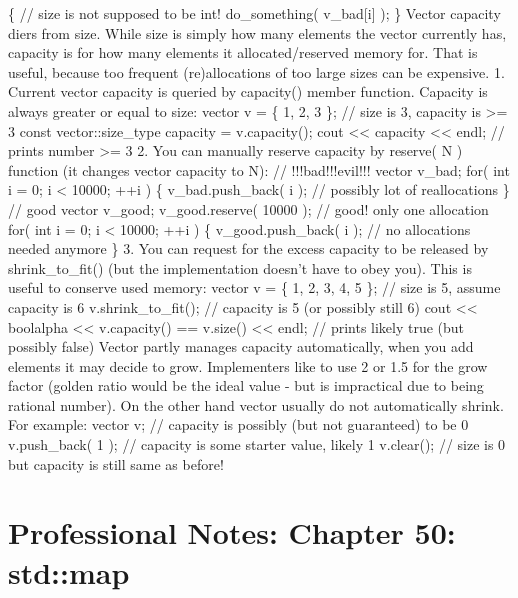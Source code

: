 \{ // size is not supposed to be int! do\_something( v\_bad{[}i{]} ); \}
Vector capacity diers from size. While size is simply how many elements
the vector currently has, capacity is for how many elements it
allocated/reserved memory for. That is useful, because too frequent
(re)allocations of too large sizes can be expensive. 1. Current vector
capacity is queried by capacity() member function. Capacity is always
greater or equal to size: vector v = \{ 1, 2, 3 \}; // size is 3,
capacity is \textgreater= 3 const vector::size\_type capacity =
v.capacity(); cout \textless\textless{} capacity \textless\textless{}
endl; // prints number \textgreater= 3 2. You can manually reserve
capacity by reserve( N ) function (it changes vector capacity to N): //
!!!bad!!!evil!!! vector v\_bad; for( int i = 0; i \textless{} 10000; ++i
) \{ v\_bad.push\_back( i ); // possibly lot of reallocations \} // good
vector v\_good; v\_good.reserve( 10000 ); // good! only one allocation
for( int i = 0; i \textless{} 10000; ++i ) \{ v\_good.push\_back( i );
// no allocations needed anymore \} 3. You can request for the excess
capacity to be released by shrink\_to\_fit() (but the implementation
doesn't have to obey you). This is useful to conserve used memory:
vector v = \{ 1, 2, 3, 4, 5 \}; // size is 5, assume capacity is 6
v.shrink\_to\_fit(); // capacity is 5 (or possibly still 6) cout
\textless\textless{} boolalpha \textless\textless{} v.capacity() ==
v.size() \textless\textless{} endl; // prints likely true (but possibly
false) Vector partly manages capacity automatically, when you add
elements it may decide to grow. Implementers like to use 2 or 1.5 for
the grow factor (golden ratio would be the ideal value - but is
impractical due to being rational number). On the other hand vector
usually do not automatically shrink. For example: vector v; // capacity
is possibly (but not guaranteed) to be 0 v.push\_back( 1 ); // capacity
is some starter value, likely 1 v.clear(); // size is 0 but capacity is
still same as before!

\hypertarget{professional-notes-chapter-50-stdmap-1}{%
\section{Professional Notes: Chapter 50:
std::map}\label{professional-notes-chapter-50-stdmap-1}}

